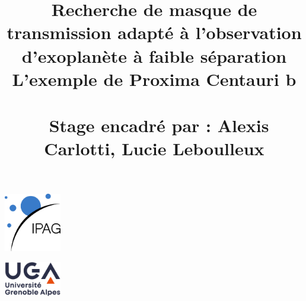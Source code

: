 \documentclass{article}
\date{}
\title{\vspace{10em}\textbf{Recherche de masque de transmission adapté à l'observation d'exoplanète à faible séparation} \\ \vspace{3em} L'exemple de Proxima Centauri b \vspace{4em} \\ \large{Stage encadré par : Alexis Carlotti, Lucie Leboulleux}}
\begin{document}
\maketitle
\vspace{5em}
\begin{center}
    \begin{minipage}{0.4\textwidth}
        \centering
        \includegraphics[width = 25mm]{figures/logo_ipag.jpg}
    \end{minipage}
    \begin{minipage}{0.4\textwidth}
        \centering    
        \includegraphics[width = 25mm]{figures/logo_uga.jpg}
    \end{minipage}
\end{center}
\thispagestyle{fancy}
\clearpage


%








\end{document}
